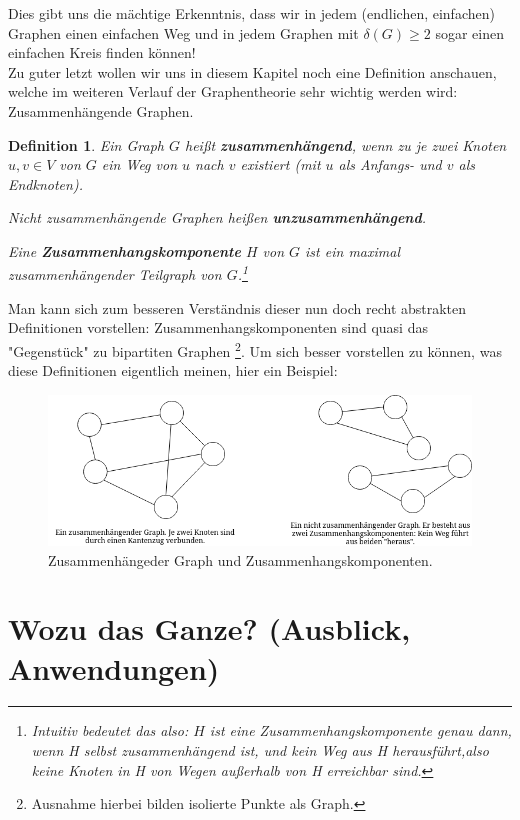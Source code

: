 \documentclass{article}
\newtheorem{definition}{Definition}
\theoremstyle{plain}
\begin{document}
Dies gibt uns die mächtige Erkenntnis, dass wir in jedem (endlichen, einfachen) Graphen einen einfachen Weg und in jedem Graphen mit $\delta(G) \geq 2$ sogar einen einfachen Kreis finden können!\\
\bigskip
Zu guter letzt wollen wir uns in diesem Kapitel noch eine Definition anschauen, welche im weiteren Verlauf der Graphentheorie sehr wichtig werden wird: Zusammenhängende Graphen.\\
\begin{definition}
	Ein Graph $G$ heißt \textbf{zusammenhängend}, wenn zu je zwei Knoten $u, v \in V$ von $G$ ein \emph{Weg} von $u$ nach $v$ existiert (mit $u$ als Anfangs- und $v$ als Endknoten).
	\par\bigskip
	Nicht zusammenhängende Graphen heißen \textbf{unzusammenhängend}.
	\par\bigskip
	Eine \textbf{Zusammenhangskomponente} $H$ von $G$ ist ein \emph{maximal zusammenhängender Teilgraph} von $G$.\footnote[2]{Intuitiv bedeutet das also: $H$ ist eine Zusammenhangskomponente genau dann, wenn H selbst zusammenhängend ist, und \emph{kein Weg aus H herausführt},also keine Knoten in H von Wegen außerhalb von H erreichbar sind.}
\end{definition}
Man kann sich zum besseren Verständnis dieser nun doch recht abstrakten Definitionen vorstellen: Zusammenhangskomponenten sind quasi das "Gegenstück" zu bipartiten Graphen \footnote[3]{Ausnahme hierbei bilden isolierte Punkte als Graph.}.
\bigskip
Um sich besser vorstellen zu können, was diese Definitionen eigentlich meinen, hier ein Beispiel:\\
\begin{figure}[!htp]
    \centering
    \includegraphics[width=13cm]{vortrag_schriftlich/images/zsmhaengend.drawio.png}
    \caption{Zusammenhängeder Graph und Zusammenhangskomponenten.}
    \label{fig:fig9}
\end{figure}

\newpage
\section[Wozu das Ganze?]{Wozu das Ganze? (Ausblick, Anwendungen)}
\end{document}
